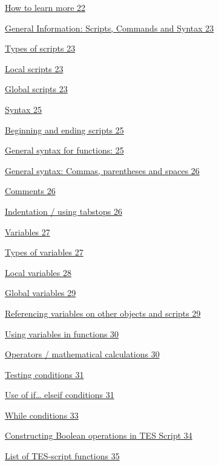 \documentclass[
]{article}
\begin{document}
\protect\hyperlink{how-to-learn-more}{How to learn more 22}

\protect\hyperlink{general-information-scripts-commands-and-syntax}{General
Information: Scripts, Commands and Syntax 23}

\protect\hyperlink{types-of-scripts}{Types of scripts 23}

\protect\hyperlink{local-scripts}{Local scripts 23}

\protect\hyperlink{global-scripts}{Global scripts 23}

\protect\hyperlink{syntax}{Syntax 25}

\protect\hyperlink{beginning-and-ending-scripts}{Beginning and ending
scripts 25}

\protect\hyperlink{general-syntax-for-functions}{General syntax for
functions: 25}

\protect\hyperlink{general-syntax-commas-parentheses-and-spaces}{General
syntax: Commas, parentheses and spaces 26}

\protect\hyperlink{comments}{Comments 26}

\protect\hyperlink{indentation-using-tabstops}{Indentation / using
tabstops 26}

\protect\hyperlink{variables}{Variables 27}

\protect\hyperlink{types-of-variables}{Types of variables 27}

\protect\hyperlink{_Toc182634499}{Local variables 28}

\protect\hyperlink{global-variables}{Global variables 29}

\protect\hyperlink{referencing-variables-on-other-objects-and-scripts}{Referencing
variables on other objects and scripts 29}

\protect\hyperlink{using-variables-in-functions}{Using variables in
functions 30}

\protect\hyperlink{section}{Operators / mathematical calculations 30}

\protect\hyperlink{_Toc182634504}{Testing conditions 31}

\protect\hyperlink{use-of-if-elseif-conditions}{Use of if\ldots{} elseif
conditions 31}

\protect\hyperlink{while-conditions}{While conditions 33}

\protect\hyperlink{constructing-boolean-operations-in-tes-script}{Constructing
Boolean operations in TES Script 34}

\protect\hyperlink{_Toc53412583}{List of TES-script functions 35}
\end{document}
